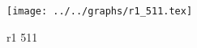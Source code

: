 \begin{figure}[h] \centering\texttt{[image: ../../graphs/r1\_511.tex]}\caption{r1 511}\label{gr:r1_511} \end{figure}
